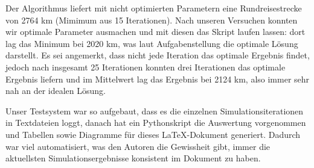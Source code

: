 Der Algorithmus liefert mit nicht optimierten Parametern eine Rundreisestrecke
von 2764 km (Mimimum aus 15 Iterationen).
Nach unseren Versuchen konnten wir optimale Parameter ausmachen und mit diesen
das Skript laufen lassen: dort lag das Minimum bei 2020 km, was laut Aufgabenstellung
die optimale Lösung darstellt.
Es sei angemerkt, dass nicht jede Iteration das optimale Ergebnis findet,
jedoch nach insgesamt 25 Iterationen konnten drei Iterationen das optimale
Ergebnis liefern und im Mittelwert lag das Ergebnis bei 2124 km,
also immer sehr nah an der idealen Lösung.

Unser Testsystem war so aufgebaut, dass es die einzelnen Simulationsiterationen
in Textdateien loggt, danach hat ein Pythonskript die Auswertung vorgenommen und
Tabellen sowie Diagramme für dieses LaTeX-Dokument generiert.
Dadurch war viel automatisiert, was den Autoren die Gewissheit gibt, immer die
aktuellsten Simulationsergebnisse konsistent im Dokument zu haben.